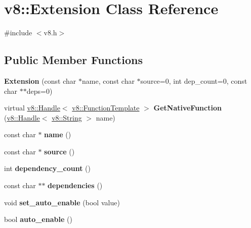 \hypertarget{classv8_1_1_extension}{}\section{v8\+:\+:Extension Class Reference}
\label{classv8_1_1_extension}


{\ttfamily \#include $<$v8.\+h$>$}

\subsection*{Public Member Functions}
\begin{DoxyCompactItemize}
\item 
\hypertarget{classv8_1_1_extension_a358ead9308cd3e060f52fea81b77fc00}{}{\bfseries Extension} (const char $\ast$name, const char $\ast$source=0, int dep\+\_\+count=0, const char $\ast$$\ast$deps=0)\label{classv8_1_1_extension_a358ead9308cd3e060f52fea81b77fc00}

\item 
\hypertarget{classv8_1_1_extension_ae526b557e0403910f6a32da2d59f64c1}{}virtual \hyperlink{classv8_1_1_handle}{v8\+::\+Handle}$<$ \hyperlink{classv8_1_1_function_template}{v8\+::\+Function\+Template} $>$ {\bfseries Get\+Native\+Function} (\hyperlink{classv8_1_1_handle}{v8\+::\+Handle}$<$ \hyperlink{classv8_1_1_string}{v8\+::\+String} $>$ name)\label{classv8_1_1_extension_ae526b557e0403910f6a32da2d59f64c1}

\item 
\hypertarget{classv8_1_1_extension_a4ab1adfcf403b274c1a469b4c37ddaf5}{}const char $\ast$ {\bfseries name} ()\label{classv8_1_1_extension_a4ab1adfcf403b274c1a469b4c37ddaf5}

\item 
\hypertarget{classv8_1_1_extension_a0e297dcbf68650fa94566fb1d58d773f}{}const char $\ast$ {\bfseries source} ()\label{classv8_1_1_extension_a0e297dcbf68650fa94566fb1d58d773f}

\item 
\hypertarget{classv8_1_1_extension_a7623b08e3bc42d903bd923a00317b7f9}{}int {\bfseries dependency\+\_\+count} ()\label{classv8_1_1_extension_a7623b08e3bc42d903bd923a00317b7f9}

\item 
\hypertarget{classv8_1_1_extension_adbec8a811d5a4554678da4a5d55dda6d}{}const char $\ast$$\ast$ {\bfseries dependencies} ()\label{classv8_1_1_extension_adbec8a811d5a4554678da4a5d55dda6d}

\item 
\hypertarget{classv8_1_1_extension_af5b752ba211315b6e9dac5c0e6e638e8}{}void {\bfseries set\+\_\+auto\+\_\+enable} (bool value)\label{classv8_1_1_extension_af5b752ba211315b6e9dac5c0e6e638e8}

\item 
\hypertarget{classv8_1_1_extension_aee87ef4f9c3d7880fc3b28765d28e516}{}bool {\bfseries auto\+\_\+enable} ()\label{classv8_1_1_extension_aee87ef4f9c3d7880fc3b28765d28e516}

\end{DoxyCompactItemize}


